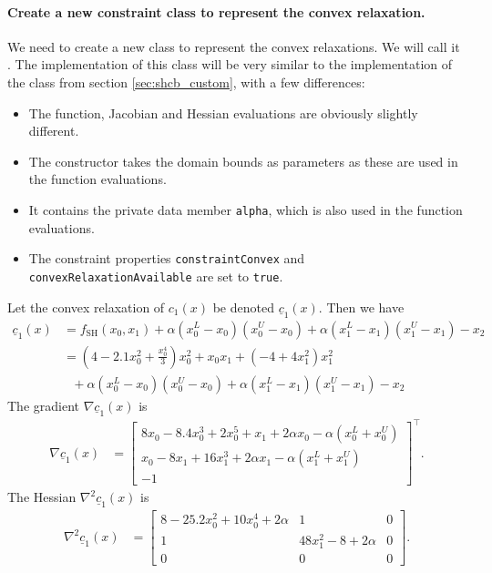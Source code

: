 \paragraph{Create a new constraint class to represent the convex relaxation.} We need to create a new class to represent the convex relaxations. We will call it . The implementation of this class will be very similar to the implementation of the  class from section \ref{sec:shcb_custom}, with a few differences:
\begin{itemize}
\item The function, Jacobian and Hessian evaluations are obviously slightly different.
\item The constructor takes the domain bounds as parameters as these are used in the function evaluations.
\item It contains the private data member \texttt{alpha}, which is also used in the function evaluations.
\item The constraint properties \texttt{constraintConvex} and \texttt{convexRelaxationAvailable} are set to \texttt{true}.
\end{itemize}
Let the convex relaxation of $c_1(x)$ be denoted $\underline{c}_1(x)$. Then we have
\begin{align*}
\underline{c}_1(x) &= f_{\mathrm{SH}}(x_0,x_1) + \alpha (x_0^L - x_0)(x_0^U - x_0) + \alpha (x_1^L - x_1)(x_1^U - x_1) - x_2 \\
&= \left( 4 - 2.1x_0^2 + \frac{x_0^4}{3} \right)x_0^2 + x_0x_1 + (-4 + 4x_1^2) x_1^2 \\
&\ \ \ + \alpha (x_0^L - x_0)(x_0^U - x_0) + \alpha (x_1^L - x_1)(x_1^U - x_1) - x_2
\end{align*}
The gradient $\nabla \underline{c}_1(x)$ is
\begin{align*}
\nabla \underline{c}_1(x) &= \begin{bmatrix} 8x_0 - 8.4 x_0^3 + 2x_0^5 + x_1 + 2\alpha x_0 - \alpha(x_0^L + x_0^U) \\ x_0 - 8x_1 + 16x_1^3 + 2\alpha x_1 - \alpha (x_1^L + x_1^U) \\ -1 \end{bmatrix}^\top.
\end{align*}
The Hessian $\nabla^2 \underline{c}_1(x)$ is
\begin{align*}
\nabla^2 \underline{c}_1(x) &= \begin{bmatrix} 8 - 25.2x_0^2 + 10x_0^4 + 2\alpha & 1 & 0 \\ 1 & 48x_1^2 - 8 + 2\alpha & 0 \\ 0 & 0 & 0 \end{bmatrix}.
\end{align*}
